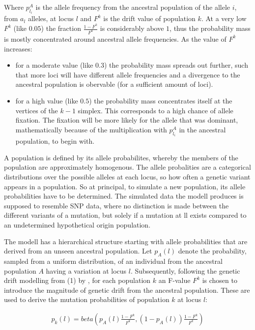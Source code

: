 \documentclass[a4paper, 11pt]{article}
\begin{document}
Where $p^A_{l_i}$ is the allele frequency from the ancestral population of the allele $i$, from $a_l$ alleles, at locus $l$ and $F^k$ is the drift value of population $k$. At a very low $F^k$ (like $0.05$) the fraction $\frac{1-F^k}{F^k}$ is considerably above $1$, thus the probability mass is mostly concentrated around ancestral allele frequencies. As the value of $F^k$ increases: 
\begin{itemize}
\item for a moderate value (like $0.3$) the probability mass spreads out further, such that more loci will have different allele frequencies and a divergence to the ancestral population is obervable (for a sufficient amount of loci).
\item for a high value (like $0.5$) the probability mass concentrates itself at the vertices of the $k-1$ simplex. This corresponds to a high chance of allele fixation. The fixation will be more likely for the allele that was dominant, mathematically because of the multiplication with $p^A_{l_i}$ in the ancestral population, to begin with. 
\end{itemize}


A population is defined by its allele probabilites, whereby the members of the population are approximately homogenous. The allele probalities are a categorical distributions over the possible alleles at each locus, so how often a genetic variant appears in a population. So at principal, to simulate a new population, its allele probabilities have to be determined. The simulated data the modell produces is supposed to resemble SNP data, where no distinction is made between the different variants of a mutation, but solely if a mutation at ll exists compared to an undetermined hypothetical origin population.

The modell has a hierarchical structure starting with allele probabilities that are derived from an unseen ancestral population. Let $p_{A}(l)$ denote the probability, sampled from a uniform distribution, of an individual from the ancestral population $A$ having a variation at locus $l$. Subsequently, following the genetic drift modelling from (1) by \cite{falush2003inference}, for each population $k$ an F-value $F^{k}$ is chosen to introduce the magnitude of genetic drift from the ancestral population. These are used to derive the mutation probabilities of population $k$ at locus $l$:

\begin{align}
p_{k}(l) = beta(p_{A}(l) \frac{1 - F^k}{F^k}, (1-p_{A}(l)) \frac{1 - F^k}{F^k})
\end{align}
\end{document}
